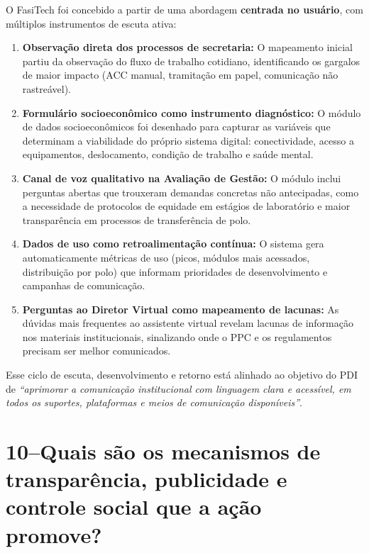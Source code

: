\documentclass[12pt,a4paper]{article}
\begin{document}
O FasiTech foi concebido a partir de uma abordagem \textbf{centrada no usuário},
com múltiplos instrumentos de escuta ativa:

\begin{enumerate}[label={\color{ufpablue}\faBullseye}, leftmargin=2.2em, itemsep=4pt]
  \item \textbf{Observação direta dos processos de secretaria:} O mapeamento inicial
    partiu da observação do fluxo de trabalho cotidiano, identificando os gargalos de
    maior impacto (ACC manual, tramitação em papel, comunicação não rastreável).

  \item \textbf{Formulário socioeconômico como instrumento diagnóstico:} O módulo de
    dados socioeconômicos foi desenhado para capturar as variáveis que determinam a
    viabilidade do próprio sistema digital: conectividade, acesso a equipamentos,
    deslocamento, condição de trabalho e saúde mental.

  \item \textbf{Canal de voz qualitativo na Avaliação de Gestão:} O módulo inclui
    perguntas abertas que trouxeram demandas concretas não antecipadas, como a
    necessidade de protocolos de equidade em estágios de laboratório e maior
    transparência em processos de transferência de polo.

  \item \textbf{Dados de uso como retroalimentação contínua:} O sistema gera
    automaticamente métricas de uso (picos, módulos mais acessados, distribuição por
    polo) que informam prioridades de desenvolvimento e campanhas de comunicação.

  \item \textbf{Perguntas ao Diretor Virtual como mapeamento de lacunas:} As dúvidas
    mais frequentes ao assistente virtual revelam lacunas de informação nos materiais
    institucionais, sinalizando onde o PPC e os regulamentos precisam ser melhor
    comunicados.
\end{enumerate}

Esse ciclo de escuta, desenvolvimento e retorno está alinhado ao objetivo do PDI de
\textit{``aprimorar a comunicação institucional com linguagem clara e acessível, em
todos os suportes, plataformas e meios de comunicação disponíveis''}.

\section{10\;–\;Quais são os mecanismos de transparência, publicidade e controle social que a ação promove?}
\end{document}
